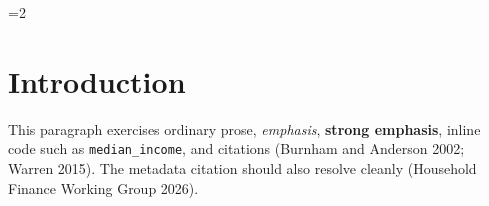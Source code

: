 \documentclass[12pt]{article}
\newif\ifhfwghfwg
\newif\ifhfwganon
\newcommand{\hfwgmaincolumns}{1}
\begin{document}
\begin{multicols}{2}
\setlength{\columnsep}{0.24in}
\raggedcolumns
\footnotesize
{}
\setlength{\parindent}{0.85em}
\setlength{\parskip}{0pt}
\titleformat{\section}{\normalsize\bfseries\color{hfwgaccent}}{}{0pt}{}
\titleformat{\subsection}{\footnotesize\bfseries}{}{0pt}{}
\titlespacing{\section}{0pt}{0.5em}{0.14em}
\titlespacing{\subsection}{0pt}{0.38em}{0.1em}
\par\vspace{0.45em}
\else
\clearpage
\fi
\setcounter{page}{1}


\ifhfwghfwg\else
\ifnum\hfwgmaincolumns=2\relax
  \twocolumn
\fi
\fi

\ifhfwganon
\begingroup
\small
\noindent\textit{This manuscript is set to anonymous mode. Identifying metadata fields are suppressed on the title page.}\par
\endgroup
\vspace{1em}
\fi

\section{Introduction}\label{introduction}

This paragraph exercises ordinary prose, \emph{emphasis}, \textbf{strong
emphasis}, inline code such as \texttt{median\_income}, and citations
(Burnham and Anderson 2002; Warren 2015). The metadata citation should
also resolve cleanly (Household Finance Working Group 2026).


\end{multicols}
\end{document}
